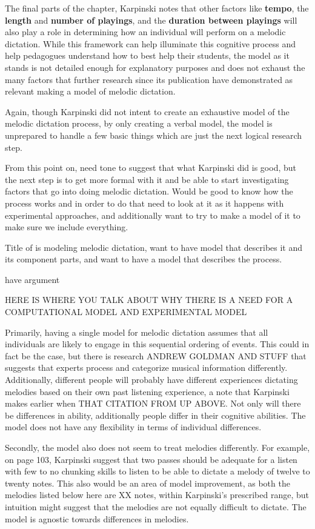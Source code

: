\documentclass[]{book}
\theoremstyle{definition}
\theoremstyle{definition}
\theoremstyle{definition}
\theoremstyle{remark}
\begin{document}
The final parts of the chapter, Karpinski notes that other factors like
\textbf{tempo}, the \textbf{length} and \textbf{number of playings}, and
the \textbf{duration between playings} will also play a role in
determining how an individual will perform on a melodic dictation. While
this framework can help illuminate this cognitive process and help
pedagogues understand how to best help their students, the model as it
stands is not detailed enough for explanatory purposes and does not
exhaust the many factors that further research since its publication
have demonstrated as relevant making a model of melodic dictation.

Again, though Karpinski did not intent to create an exhaustive model of
the melodic dictation process, by only creating a verbal model, the
model is unprepared to handle a few basic things which are just the next
logical research step.

From this point on, need tone to suggest that what Karpinski did is
good, but the next step is to get more formal with it and be able to
start investigating factors that go into doing melodic dictation. Would
be good to know how the process works and in order to do that need to
look at it as it happens with experimental approaches, and additionally
want to try to make a model of it to make sure we include everything.

Title of is modeling melodic dictation, want to have model that
describes it and its component parts, and want to have a model that
describes the process.

have argument

HERE IS WHERE YOU TALK ABOUT WHY THERE IS A NEED FOR A COMPUTATIONAL
MODEL AND EXPERIMENTAL MODEL

Primarily, having a single model for melodic dictation assumes that all
individuals are likely to engage in this sequential ordering of events.
This could in fact be the case, but there is research ANDREW GOLDMAN AND
STUFF that suggests that experts process and categorize musical
information differently. Additionally, different people will probably
have different experiences dictating melodies based on their own past
listening experience, a note that Karpinski makes earlier when THAT
CITATION FROM UP ABOVE. Not only will there be differences in ability,
additionally people differ in their cognitive abilities. The model does
not have any flexibility in terms of individual differences.

Secondly, the model also does not seem to treat melodies differently.
For example, on page 103, Karpinski suggest that two passes should be
adequate for a listen with few to no chunking skills to listen to be
able to dictate a melody of twelve to twenty notes. This also would be
an area of model improvement, as both the melodies listed below here are
XX notes, within Karpinski's prescribed range, but intuition might
suggest that the melodies are not equally difficult to dictate. The
model is agnostic towards differences in melodies.
\end{document}
